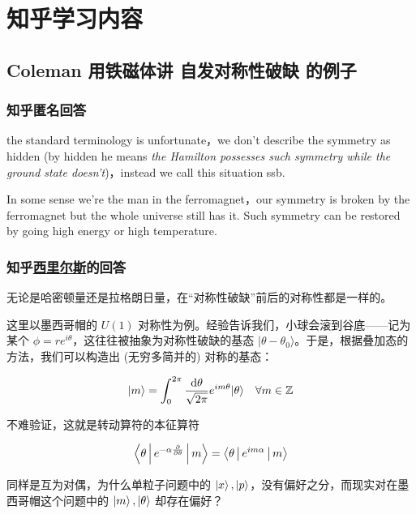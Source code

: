 \chapter{知乎学习内容}

\section{Coleman 用铁磁体讲 自发对称性破缺 的例子}

\subsection{知乎匿名回答}

the standard terminology is unfortunate，we don't describe the symmetry as hidden (by hidden he means \emph{the Hamilton possesses such symmetry while the ground state doesn't})，instead we call this situation ssb.

In some sense we're the man in the ferromagnet，our symmetry is broken by the ferromagnet but the whole universe still has it. Such symmetry can be restored by going high energy or high temperature.

\subsection{知乎\href{https://www.zhihu.com/people/imserious}{西里尔斯}的回答}

无论是哈密顿量还是拉格朗日量，在“对称性破缺”前后的对称性都是一样的。

这里以墨西哥帽的 $U(1)$ 对称性为例。经验告诉我们，小球会滚到谷底——记为某个 $\phi=r e^{i \theta}$，这往往被抽象为对称性破缺的基态 $|\theta-\theta_0\rangle$。于是，根据叠加态的方法，我们可以构造出 (无穷多简并的) 对称的基态：

\begin{equation}
    |m\rangle = \int_0^{2\pi} \frac{\mathop{}\!\mathrm{d} \theta}{\sqrt{2\pi}} e^{im \theta} |\theta\rangle \quad \forall m \in \mathbb{Z}
    \label{equ:1}
\end{equation}

不难验证，这就是转动算符的本征算符

\begin{equation*}
    \Braket{\theta | e^{-\alpha \frac{\partial}{\partial \theta}} | m} = \Braket{\theta | e^{im\alpha} | m}
\end{equation*}

同样是互为对偶，为什么单粒子问题中的 $\ket{x}, \ket{p}$，没有偏好之分，而现实对在墨西哥帽这个问题中的 $\ket{m}, \ket{\theta}$ 却存在偏好？

